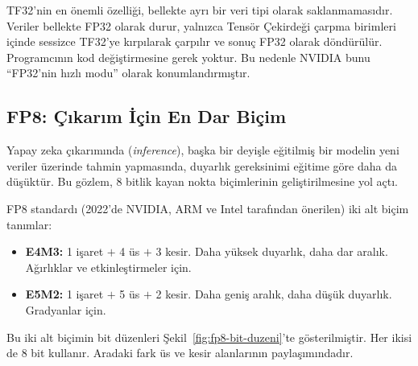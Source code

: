 TF32'nin en önemli özelliği, bellekte ayrı bir veri tipi olarak saklanmamasıdır. Veriler bellekte FP32 olarak durur, yalnızca Tensör Çekirdeği çarpma birimleri içinde sessizce TF32'ye kırpılarak çarpılır ve sonuç FP32 olarak döndürülür. Programcının kod değiştirmesine gerek yoktur. Bu nedenle NVIDIA bunu ``FP32'nin hızlı modu'' olarak konumlandırmıştır.

\subsection{FP8: Çıkarım İçin En Dar Biçim}

Yapay zeka çıkarımında (\emph{inference}), başka bir deyişle eğitilmiş bir modelin yeni veriler üzerinde tahmin yapmasında, duyarlık gereksinimi eğitime göre daha da düşüktür. Bu gözlem, 8 bitlik kayan nokta biçimlerinin geliştirilmesine yol açtı.

FP8 standardı (2022'de NVIDIA, ARM ve Intel tarafından önerilen) iki alt biçim tanımlar:
\begin{itemize}
  \item \textbf{E4M3:} 1 işaret $+$ 4 üs $+$ 3 kesir. Daha yüksek duyarlık, daha dar aralık. Ağırlıklar ve etkinleştirmeler için.
  \item \textbf{E5M2:} 1 işaret $+$ 5 üs $+$ 2 kesir. Daha geniş aralık, daha düşük duyarlık. Gradyanlar için.
\end{itemize}

Bu iki alt biçimin bit düzenleri Şekil~\ref{fig:fp8-bit-duzeni}'te gösterilmiştir. Her ikisi de 8 bit kullanır. Aradaki fark üs ve kesir alanlarının paylaşımındadır.

